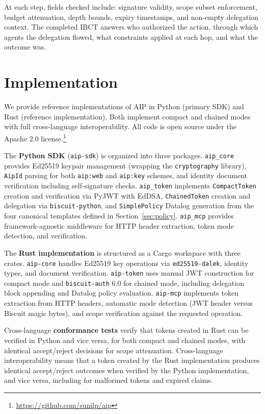 \documentclass[11pt,a4paper]{article}
\newcommand{\aip}{\textsc{AIP}}
\newcommand{\ibct}{\textsc{IBCT}}
\begin{document}
At each step, fields checked include: signature validity, scope subset enforcement, budget attenuation, depth bounds, expiry timestamps, and non-empty delegation context. The completed \ibct{} answers who authorized the action, through which agents the delegation flowed, what constraints applied at each hop, and what the outcome was.

\section{Implementation}
\label{sec:impl}

We provide reference implementations of \aip{} in Python (primary SDK) and Rust (reference implementation). Both implement compact and chained modes with full cross-language interoperability. All code is open source under the Apache 2.0 license.\footnote{\url{https://github.com/sunilp/aip}}

The \textbf{Python SDK} (\texttt{aip-sdk}) is organized into three packages. \texttt{aip\_core} provides Ed25519 keypair management (wrapping the \texttt{cryptography} library), \texttt{AipId} parsing for both \texttt{aip:web} and \texttt{aip:key} schemes, and identity document verification including self-signature checks. \texttt{aip\_token} implements \texttt{CompactToken} creation and verification via PyJWT with EdDSA, \texttt{ChainedToken} creation and delegation via \texttt{biscuit-python}, and \texttt{SimplePolicy} Datalog generation from the four canonical templates defined in Section~\ref{sec:policy}. \texttt{aip\_mcp} provides framework-agnostic middleware for HTTP header extraction, token mode detection, and verification.

The \textbf{Rust implementation} is structured as a Cargo workspace with three crates. \texttt{aip-core} handles Ed25519 key operations via \texttt{ed25519-dalek}, identity types, and document verification. \texttt{aip-token} uses manual JWT construction for compact mode and \texttt{biscuit-auth} 6.0 for chained mode, including delegation block appending and Datalog policy evaluation. \texttt{aip-mcp} implements token extraction from HTTP headers, automatic mode detection (JWT header versus Biscuit magic bytes), and scope verification against the requested operation.

Cross-language \textbf{conformance tests} verify that tokens created in Rust can be verified in Python and vice versa, for both compact and chained modes, with identical accept/reject decisions for scope attenuation. Cross-language interoperability means that a token created by the Rust implementation produces identical accept/reject outcomes when verified by the Python implementation, and vice versa, including for malformed tokens and expired claims.
\end{document}
